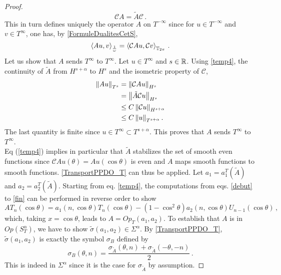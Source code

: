\documentclass[a4paper]{article}
\begin{document}
\begin{proof}
\begin{equation}
	\mathcal{C}A = \tilde{A}\mathcal{C}\,.
	\label{temp4}
	\end{equation}
	This in turn defines uniquely the operator $A$ on $T^{-\infty}$ since for $u \in T^{-\infty}$ and $v \in T^{\infty}$, one has, by \autoref{FormuleDualitesCetS},
	\[\left\langle Au,v\right\rangle_\frac{1}{\omega} = \left\langle \mathcal{C}Au,\mathcal{C}v\right\rangle_{\mathbb{T}_{2\pi}}\,.\]
	Let us show that $A$ sends $T^{\infty}$ to $T^{\infty}$. Let $u \in T^{\infty}$ and $s\in \mathbb{R}$. Using \eqref{temp4}, the continuity of $\tilde{A}$ from $H^{s+\alpha}$ to $H^{s}$ and the isometric property of $\mathcal{C}$,  
	\[\begin{split}
		\left\|Au\right\|_{T^s} &= \left\|\mathcal{C}Au\right\|_{H^s}\\
		&= \left\|\tilde{A}\mathcal{C}u\right\|_{H^s}\\
		& \leq C \left\|\mathcal{C}u\right\|_{H^{s + \alpha}}\\
		& \leq C \left\|u\right\|_{T^{s + \alpha}}.
	\end{split}\]
	The last quantity is finite since $u \in T^{\infty} \subset T^{s+\alpha}$. This proves that $A$ sends $T^\infty$ to $T^\infty$. \\
	Eq (\ref{temp4}) implies in particular that $\tilde{A}$ stabilizes the set of smooth even functions since $\mathcal{C}Au(\theta) = Au(\cos\theta)$ is even and $A$ maps smooth functions to smooth functions. \autoref{TransportPPDO_T} can thus be applied. Let $a_1 = a_1^T(\tilde{A})$ and $a_2 = a_2^T(\tilde{A})$. Starting from eq. \eqref{temp4}, the computations from eqs. \eqref{debut} to \eqref{fin} can be performed in reverse order to show
	\[AT_n(\cos \theta) = a_1(n,\cos\theta) T_n(\cos\theta) -(1 - \cos^2\theta) a_2(n,\cos\theta) U_{n-1}(\cos\theta)\,,\]
	which, taking $x = \cos\theta$, leads to $A = \textit{Op}_T(a_1,a_2)$. To establish that $A$ is in $\textit{Op}(S^\alpha_T)$, we have to show $\tilde{\sigma}(a_1,a_2) \in  \Sigma^\alpha$. By \autoref{TransportPPDO_T}, $\tilde{\sigma}(a_1,a_2) $ is exactly the symbol $\sigma_B$ defined by 
	\[\sigma_B(\theta,n) = \frac{\sigma_{\tilde{A}}(\theta,n) + \sigma_{\tilde{A}}(-\theta,-n)}{2}\,.\] 
	This is indeed in $\Sigma^\alpha$ since it is the case for $\sigma_{\tilde{A}}$ by assumption. 
\end{proof}
\end{document}

